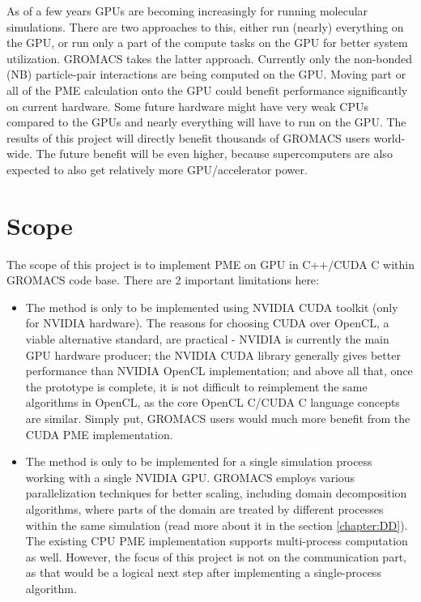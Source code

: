 \documentclass[12pt,a4paper]{report}
\begin{document}

As of a few years GPUs are becoming increasingly for running molecular simulations. There are two approaches to this, either run (nearly) everything on the GPU, or run only a part of the compute tasks on the GPU for better system utilization. GROMACS takes the latter approach. Currently only the non-bonded (NB) particle-pair interactions are being computed on the GPU. Moving part or all of the PME calculation onto the GPU could benefit performance significantly on current hardware. Some future hardware might have very weak CPUs compared to the GPUs and nearly everything will have to run on the GPU. The results of this project will directly benefit thousands of GROMACS users world-wide. The future benefit will be even higher, because supercomputers are also expected to also get relatively more GPU/accelerator power.

\section{Scope} \label{chapter_scope}

The scope of this project is to implement PME on GPU in C++/CUDA C within GROMACS code base.
There are 2 important limitations here:
\begin{itemize}
\item The method is only to be implemented using NVIDIA CUDA toolkit (only for NVIDIA hardware). The reasons for choosing CUDA over OpenCL, a viable alternative standard, are practical - NVIDIA is currently the main GPU hardware producer; the NVIDIA CUDA library generally gives better performance than NVIDIA OpenCL implementation; and above all that, once the prototype is complete, it is not difficult to reimplement the same algorithms in OpenCL, as the core OpenCL C/CUDA C language concepts are similar. Simply put, GROMACS users would much more benefit from the CUDA PME implementation.
\item The method is only to be implemented for a single simulation process working with a single NVIDIA GPU. GROMACS employs various parallelization techniques for better scaling, including domain decomposition algorithms, where parts of the domain are treated by different processes within the same simulation (read more about it in the section \ref{chapter:DD}). The existing CPU PME implementation supports multi-process computation as well. However, the focus of this project is not on the communication part, as that would be a logical next step after implementing a single-process algorithm. 
\end{itemize}
\iffalse
\end{document}
